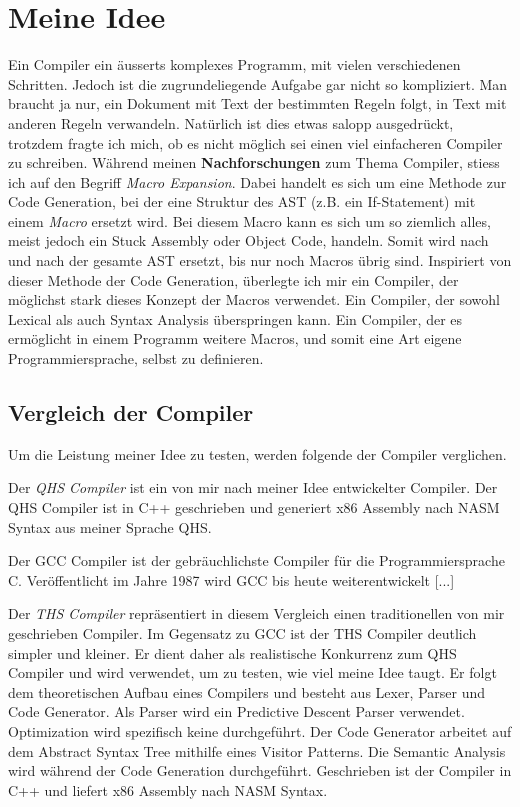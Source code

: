 \chapter{Meine Idee}
Ein Compiler ein äusserts komplexes Programm, mit vielen verschiedenen Schritten. Jedoch ist die zugrundeliegende Aufgabe gar nicht so kompliziert.
Man braucht ja nur, ein Dokument mit Text der bestimmten Regeln folgt, in Text mit anderen Regeln verwandeln. Natürlich ist dies etwas salopp ausgedrückt, trotzdem fragte ich mich,
ob es nicht möglich sei einen viel einfacheren Compiler zu schreiben. Während meinen \textbf{Nachforschungen} zum Thema Compiler, stiess ich auf den Begriff \textit{Macro Expansion}.
Dabei handelt es sich um eine Methode zur Code Generation, bei der eine Struktur des AST (z.B. ein If-Statement) mit einem \textit{Macro} ersetzt wird. Bei diesem Macro kann es sich um so ziemlich alles,
meist jedoch ein Stuck Assembly oder Object Code, handeln. Somit wird nach und nach der gesamte AST ersetzt, bis nur noch Macros übrig sind. Inspiriert von dieser Methode der Code Generation,
überlegte ich mir ein Compiler, der möglichst stark dieses Konzept der Macros verwendet. Ein Compiler, der sowohl Lexical als auch Syntax Analysis überspringen kann.
Ein Compiler, der es ermöglicht in einem Programm weitere Macros, und somit eine Art eigene Programmiersprache, selbst zu definieren.

\section{Vergleich der Compiler}
Um die Leistung meiner Idee zu testen, werden folgende der Compiler verglichen.

Der \textit{QHS Compiler} ist ein von mir nach meiner Idee entwickelter Compiler.
Der QHS Compiler ist in C++ geschrieben und generiert x86 Assembly nach NASM Syntax aus meiner Sprache QHS.

Der GCC Compiler ist der gebräuchlichste Compiler für die Programmiersprache C. Veröffentlicht im Jahre 1987 wird GCC bis heute weiterentwickelt [...]

Der \textit{THS Compiler} repräsentiert in diesem Vergleich einen traditionellen von mir geschrieben Compiler. Im Gegensatz zu GCC ist der THS Compiler deutlich simpler und kleiner.
Er dient daher als realistische Konkurrenz zum QHS Compiler und wird verwendet, um zu testen, wie viel meine Idee taugt. Er folgt dem theoretischen Aufbau eines Compilers und besteht aus Lexer, Parser und Code Generator.
Als Parser wird ein Predictive Descent Parser verwendet. Optimization wird spezifisch keine durchgeführt. Der Code Generator arbeitet auf dem Abstract Syntax Tree mithilfe eines Visitor Patterns.
Die Semantic Analysis wird während der Code Generation durchgeführt. Geschrieben ist der Compiler in C++ und liefert x86 Assembly nach NASM Syntax.



